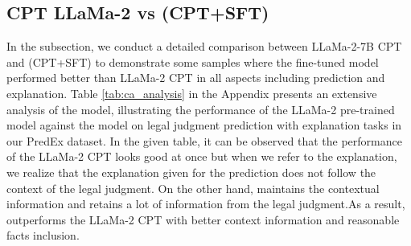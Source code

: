 \subsection{CPT LLaMa-2 vs \namel (CPT+SFT)}
\label{subsec:CPT-vs-SFT}
In the subsection, we conduct a detailed comparison between LLaMa-2-7B CPT and \namel (CPT+SFT) to demonstrate some samples where the fine-tuned model \namel performed better than LLaMa-2 CPT in all aspects including prediction and explanation. Table \ref{tab:ca_analysis} in the Appendix presents an extensive analysis of the model, illustrating the performance of the LLaMa-2 pre-trained model against the \namel model on legal judgment prediction with explanation tasks in our PredEx dataset. In the given table, it can be observed that the performance of the LLaMa-2 CPT looks good at once but when we refer to the explanation, we realize that the explanation given for the prediction does not follow the context of the legal judgment. On the other hand, \namel maintains the contextual information and retains a lot of information from the legal judgment.As a result, \namel outperforms the LLaMa-2 CPT with better context information and reasonable facts inclusion.



